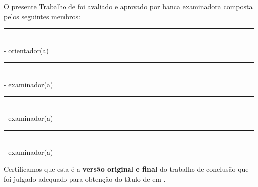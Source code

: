 {\begin{Center}
        \textbf{\tituloTrabalho\separadorTrabalho}\subtituloTrabalho
    \end{Center}
    
    \vspace{\baselineskip}
    O presente Trabalho de \modalidadeCurso\space foi avaliado e aprovado por banca examinadora composta pelos seguintes membros:

    \begin{Center}
        \vspace{\baselineskip}
        \rule{6.5cm}{1pt}\\
        \orientadorTitulacao\space \orientador\space - orientador(a)\\    
        \orientadorInstituicao


        \vspace{\baselineskip}
        \rule{6.5cm}{1pt}\\
        \bancaUmTitulacao\space \bancaUm\space - examinador(a)\\    
        \bancaUmInstituicao

        \vspace{\baselineskip}
        \rule{6.5cm}{1pt}\\
        \bancaDoisTitulacao\space \bancaDois\space - examinador(a)\\    
        \bancaDoisInstituicao

        \vspace{\baselineskip}
        \rule{6.5cm}{1pt}\\
        \bancaTresTitulacao\space \bancaTres\space - examinador(a)\\    
        \bancaTresInstituicao
    \end{Center}

    \vspace{\baselineskip}

    Certificamos que esta é a \textbf{versão original e final} do trabalho de conclusão que foi julgado adequado para obtenção do título de \tituloCurso\space em \nomeCurso.
    
}
